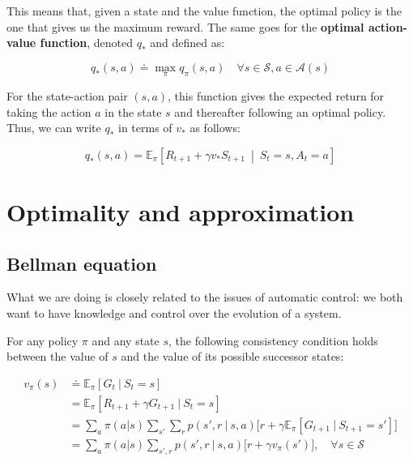 This means that, given a state and the value function, the optimal policy is the one that gives us the maximum reward. The same goes for the \textbf{optimal action-value function}, denoted $q_*$ and defined as:

\begin{equation}
    q_*(s,a) \doteq \max_\pi q_\pi(s,a) \quad \forall s \in \mathcal{S}, a \in \mathcal{A}(s)
    \label{eq:ch2-optimalactionvaluefunction}
\end{equation}

For the state-action pair $(s,a)$, this function gives the expected return for taking the action $a$ in the state $s$ and thereafter following an optimal policy. Thus, we can write $q_*$ in terms of $v_*$ as follows:

\begin{equation*}
    q_*(s,a) = \mathbb{E}_{\pi} \left[ R_{t+1} + \gamma v_* S_{t+1} \  \middle\vert \ S_t = s, A_t = a \right]
\end{equation*}

\section{Optimality and approximation}
\subsection{Bellman equation}
What we are doing is closely related to the issues of automatic control: we both want to have knowledge and control over the evolution of a system.

For any policy $\pi$ and any state $s$, the following consistency condition holds between the value of $s$ and the value of its possible successor states:

\begin{equation}
    \begin{split}
        v_\pi(s) & \doteq \mathbb{E}_\pi \left[ G_t \ \vert \ S_t = s \right] \\
        & = \mathbb{E}_\pi \left[ R_{t+1} + \gamma G_{t+1} \ \vert \ S_t = s \right] \\
        & = \sum_{a} \pi(a \vert s) \sum_{s'} \sum_{r} p(s',r \ \vert \ s,a) \Big[ r + \gamma \mathbb{E}_\pi \left[ G_{t+1} \ \vert \ S_{t+1} = s' \right] \Big] \\
        & = \sum_{a} \pi (a \vert s) \sum_{s', r} p(s', r \ \vert \ s,a) \Big[ r + \gamma v_\pi(s') \Big], \quad \forall s \in \mathcal{S}
    \end{split}
    \label{eq:ch2-bellmanequation}
\end{equation}


